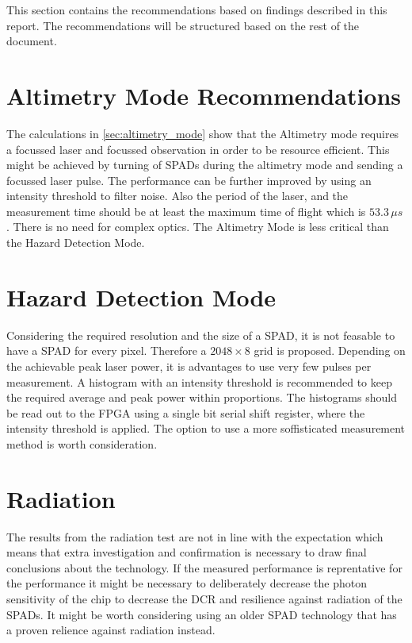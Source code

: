 This section contains the recommendations based on findings described in this report. The recommendations will be structured based on the rest of the document.

\section{Altimetry Mode Recommendations}
The calculations in \cref{sec:altimetry_mode} show that the Altimetry mode requires a focussed laser and focussed observation in order to be resource efficient. This might be achieved by turning of SPADs during the altimetry mode and sending a focussed laser pulse. The performance can be further improved by using an intensity threshold to filter noise. Also the period of the laser, and the measurement time should be at least the maximum time of flight which is $53.3\,\mu s$. There is no need for complex optics. The Altimetry Mode is less critical than the Hazard Detection Mode. 

\section{Hazard Detection Mode}
Considering the required resolution and the size of a SPAD, it is not feasable to have a SPAD for every pixel. Therefore a $2048\times8$ grid is proposed. Depending on the achievable peak laser power, it is advantages to use very few pulses per measurement. A histogram with an intensity threshold is recommended to keep the required average and peak power within proportions. The histograms should be read out to the FPGA using a single bit serial shift register, where the intensity threshold is applied. The option to use a more soffisticated measurement method is worth consideration.

\section{Radiation}
The results from the radiation test are not in line with the expectation which means that extra investigation and confirmation is necessary to draw final conclusions about the technology. If the measured performance is reprentative for the performance it might be necessary to deliberately decrease the photon sensitivity of the chip to decrease the DCR and resilience against radiation of the SPADs. It might be worth considering using an older SPAD technology that has a proven relience against radiation instead.
